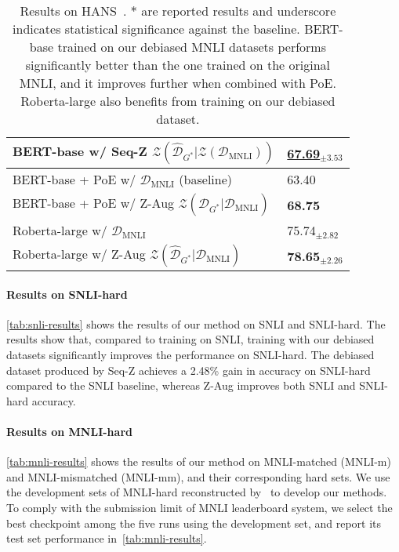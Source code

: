 \begin{table}[!bt]
\begin{center}
{\begin{tabular}{ll}
      BERT-base w/ Seq-Z $\mathcal{Z}( \hat{\mathcal{D}}_{G^*} | \mathcal{Z}(\mathcal{D}_{\text{MNLI}}))$ & \underline{\textbf{67.69}}$_{\pm 3.53}$   \\
      \midrule
      BERT-base + PoE w/ $\mathcal{D}_{\text{MNLI}}$ (baseline) & 63.40 \\
      BERT-base + PoE w/ Z-Aug $\mathcal{Z}(\hat{\mathcal{D}}_{G^*} | \mathcal{D}_{\text{MNLI}})$ & \textbf{68.75} \\
      \midrule
      Roberta-large w/ $\mathcal{D}_{\text{MNLI}}$ & 75.74$_{\pm 2.82}$ \\
      Roberta-large w/ Z-Aug $\mathcal{Z}(\hat{\mathcal{D}}_{G^*} | \mathcal{D}_{\text{MNLI}})$ & \textbf{78.65}$_{\pm 2.26}$  \\
      \bottomrule
    \end{tabular}
}
\caption{Results on HANS~\citep{hans}. $*$ are reported results and underscore indicates statistical significance against the baseline.
BERT-base trained on our debiased MNLI datasets performs significantly better than the one trained on the original MNLI, and it improves further when combined with PoE. Roberta-large also benefits from training on our debiased dataset.
} \label{tab:hans-results}
\end{center}
\end{table}



\paragraph{Results on SNLI-hard}
\cref{tab:snli-results} shows the results of our method on SNLI and SNLI-hard. 
The results show that, compared to training on SNLI, training with our debiased datasets significantly improves the performance on SNLI-hard. 
The debiased dataset produced by Seq-Z achieves a 2.48\% gain in accuracy on SNLI-hard compared to the SNLI baseline, 
whereas Z-Aug improves both SNLI and SNLI-hard accuracy.


\paragraph{Results on MNLI-hard}
\cref{tab:mnli-results} shows the results of our method on MNLI-matched (MNLI-m) and MNLI-mismatched (MNLI-mm), and their corresponding hard sets.
We use the development sets of MNLI-hard reconstructed by~\citep{karimi-mahabadi-etal-2020-end} to develop our methods. 
To comply with the submission limit of MNLI leaderboard system,
we select the best checkpoint among the five runs using the development set, and report its test set performance in~\cref{tab:mnli-results}.


